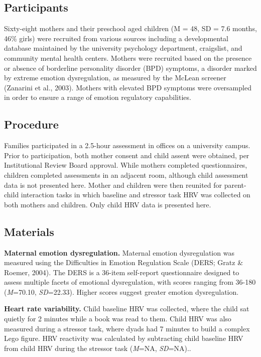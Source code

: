 \documentclass[man]{apa6}
\begin{document}
\subsection{Participants}\label{participants}

Sixty-eight mothers and their preschool aged children (M = 48, SD = 7.6
months, 46\% girls) were recruited from various sources including a
developmental database maintained by the university psychology
department, craigslist, and community mental health centers. Mothers
were recruited based on the presence or absence of borderline
personality disorder (BPD) symptoms, a disorder marked by extreme
emotion dysregulation, as measured by the McLean screener (Zanarini et
al., 2003). Mothers with elevated BPD symptoms were oversampled in order
to ensure a range of emotion regulatory capabilities.

\subsection{Procedure}\label{procedure}

Families participated in a 2.5-hour assessment in offices on a
university campus. Prior to participation, both mother consent and child
assent were obtained, per Institutional Review Board approval. While
mothers completed questionnaires, children completed assessments in an
adjacent room, although child assessment data is not presented here.
Mother and children were then reunited for parent-child interaction
tasks in which baseline and stressor task HRV was collected on both
mothers and children. Only child HRV data is presented here.

\subsection{Materials}\label{materials}

\textbf{Maternal emotion dysregulation.} Maternal emotion dysregulation
was measured using the Difficulties in Emotion Regulation Scale (DERS;
Gratz \& Roemer, 2004). The DERS is a 36-item self-report questionnaire
designed to assess multiple facets of emotional dysregulation, with
scores ranging from 36-180 (\emph{M}=70.10, \emph{SD}=22.33). Higher
scores suggest greater emotion dysregulation.

\textbf{Heart rate variability.} Child baseline HRV was collected, where
the child sat quietly for 2 minutes while a book was read to them. Child
HRV was also measured during a stressor task, where dyads had 7 minutes
to build a complex Lego figure. HRV reactivity was calculated by
subtracting child baseline HRV from child HRV during the stressor task
(\emph{M}=NA, \emph{SD}=NA)..
\end{document}
